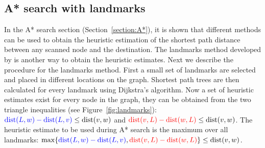 \subsection{A* search with landmarks}
In the A* search section (Section~\ref{section:A*}), 
it is shown that different methods can be used to obtain the heuristic estimation of the shortest path distance between any scanned node and the destination.
The landmarks method developed by \citet{GoldbergLandmarks} is another way to obtain the heuristic estimates.
Next we describe the procedure for the landmarks method.
First a small set of landmarks are selected and placed in different locations on the graph.
Shortest path trees are then calculated for every landmark using Dijkstra's algorithm.
Now a set of heuristic estimates exist for every node in the graph,
they can be obtained from the two triangle inequalities (see Figure~\ref{fig:landmarks}):
$ \textcolor{blue}{\text{dist}(L,w)-\text{dist}(L,v)} \leq \text{dist}(v, w)$ 
and
$ \textcolor{red}{\text{dist}(v,L)-\text{dist}(w,L)} \leq \text{dist}(v, w)$.
The heuristic estimate to be used during A* search is the maximum over all landmarks:
$ \max\{ \textcolor{blue}{\text{dist}(L,w)-\text{dist}(L,v)}, \textcolor{red}{\text{dist}(v,L)-\text{dist}(w,L)} \} \leq \text{dist}(v,w)$.

